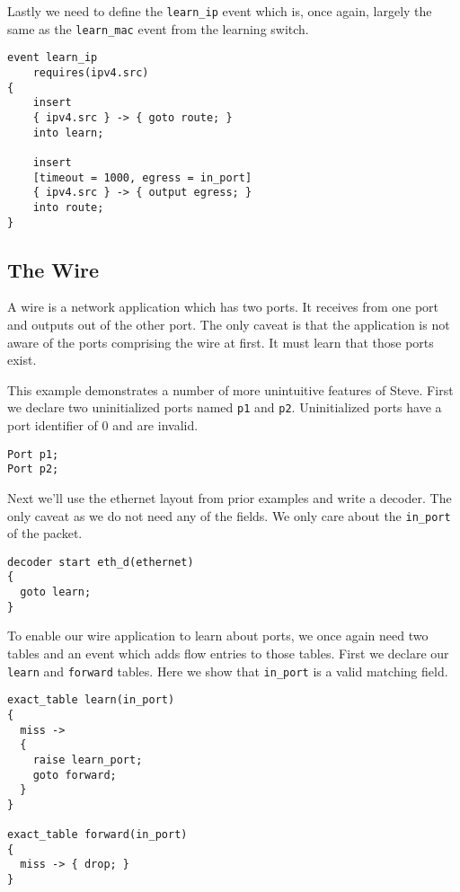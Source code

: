 Lastly we need to define the \texttt{learn\_ip} event which is, once again, largely the same as the \texttt{learn\_mac} event from the learning switch.

\begin{lstlisting}
event learn_ip
	requires(ipv4.src)
{
	insert
	{ ipv4.src } -> { goto route; }
	into learn;

	insert
	[timeout = 1000, egress = in_port]
	{ ipv4.src } -> { output egress; }
	into route;
}
\end{lstlisting}

\subsection{The Wire} \label{wire}

A wire is a network application which has two ports. It receives from one port and outputs out of the other port. The only caveat is that the application is not aware of the ports comprising the wire at first. It must learn that those ports exist.

This example demonstrates a number of more unintuitive features of Steve. First we declare two uninitialized ports named \texttt{p1} and \texttt{p2}. Uninitialized ports have a port identifier of 0 and are invalid.

\begin{lstlisting}
Port p1;
Port p2;
\end{lstlisting}

Next we'll use the ethernet layout from prior examples and write a decoder. The only caveat as we do not need any of the fields. We only care about the \texttt{in\_port} of the packet.

\begin{lstlisting}
decoder start eth_d(ethernet)
{
  goto learn;
}
\end{lstlisting}

To enable our wire application to learn about ports, we once again need two tables and an event which adds flow entries to those tables. First we declare our \texttt{learn} and \texttt{forward} tables. Here we show that \texttt{in\_port} is a valid matching field.

\begin{lstlisting}
exact_table learn(in_port)
{
  miss -> 
  {
  	raise learn_port;
    goto forward;
  }
}

exact_table forward(in_port)
{
  miss -> { drop; }
}
\end{lstlisting}

